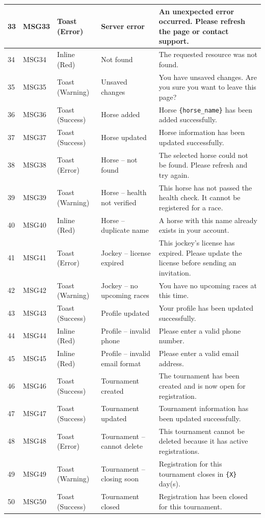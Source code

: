 \begin{longtable}{|p{}|p{}|p{}|p{}|p{}|}
33 & MSG33 & Toast (Error) & Server error & An unexpected error occurred. Please refresh the page or contact support. \\
\hline
34 & MSG34 & Inline (Red) & Not found & The requested resource was not found. \\
\hline
35 & MSG35 & Toast (Warning) & Unsaved changes & You have unsaved changes. Are you sure you want to leave this page? \\
\hline

36 & MSG36 & Toast (Success) & Horse added & Horse \texttt{\{horse\_name\}} has been added successfully. \\
\hline
37 & MSG37 & Toast (Success) & Horse updated & Horse information has been updated successfully. \\
\hline
38 & MSG38 & Toast (Error) & Horse -- not found & The selected horse could not be found. Please refresh and try again. \\
\hline
39 & MSG39 & Toast (Warning) & Horse -- health not verified & This horse has not passed the health check. It cannot be registered for a race. \\
\hline
40 & MSG40 & Inline (Red) & Horse -- duplicate name & A horse with this name already exists in your account. \\
\hline

41 & MSG41 & Toast (Error) & Jockey -- license expired & This jockey's license has expired. Please update the license before sending an invitation. \\
\hline
42 & MSG42 & Toast (Warning) & Jockey -- no upcoming races & You have no upcoming races at this time. \\
\hline
43 & MSG43 & Toast (Success) & Profile updated & Your profile has been updated successfully. \\
\hline
44 & MSG44 & Inline (Red) & Profile -- invalid phone & Please enter a valid phone number. \\
\hline
45 & MSG45 & Inline (Red) & Profile -- invalid email format & Please enter a valid email address. \\
\hline

46 & MSG46 & Toast (Success) & Tournament created & The tournament has been created and is now open for registration. \\
\hline
47 & MSG47 & Toast (Success) & Tournament updated & Tournament information has been updated successfully. \\
\hline
48 & MSG48 & Toast (Error) & Tournament -- cannot delete & This tournament cannot be deleted because it has active registrations. \\
\hline
49 & MSG49 & Toast (Warning) & Tournament -- closing soon & Registration for this tournament closes in \texttt{\{X\}} day(s). \\
\hline
50 & MSG50 & Toast (Success) & Tournament closed & Registration has been closed for this tournament. \\
\hline


\end{longtable}
